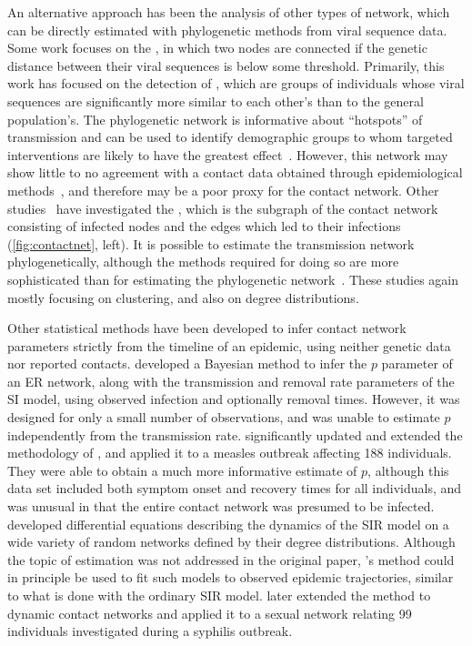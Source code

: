 An alternative approach has been the analysis of other types of network, which
can be directly estimated with phylogenetic methods from viral sequence data.
Some work focuses on the , in which two nodes are
connected if the genetic distance between their viral sequences is below some
threshold.  Primarily, this work has focused on the detection of
, which are groups of individuals whose viral
sequences are significantly more similar to each other's than to the general
population's.  The phylogenetic network is informative about ``hotspots'' of
transmission and can be used to identify demographic groups to whom targeted
interventions are likely to have the greatest effect~\autocite{poon2015impact}.
However, this network may show little to no agreement with a contact data
obtained through epidemiological methods~\autocite{yirrell1998molecular,
resik2007limitations, robinson2013dynamics}, and therefore may be a poor proxy
for the contact network. Other studies~\autocite{brown2011transmission} have
investigated the , which is the subgraph of the
contact network consisting of infected nodes and the edges which led to their
infections~\autocite{welch2011statistical} (\cref{fig:contactnet}, left). It is
possible to estimate the transmission network phylogenetically, although the
methods required for doing so are more sophisticated than for estimating the
phylogenetic network~\autocite{brown2011transmission}. These studies again
mostly focusing on clustering, and also on degree distributions.

Other statistical methods have been developed to infer contact network
parameters strictly from the timeline of an epidemic, using neither genetic
data nor reported contacts. \textcite{britton2002bayesian} developed a Bayesian
method to infer the $p$ parameter of an \gls{ER} network, along with the
transmission and removal rate parameters of the \gls{SI} model, using observed
infection and optionally removal times. However, it was designed for only a
small number of observations, and was unable to estimate $p$ independently from
the transmission rate.  \textcite{groendyke2011bayesian} significantly updated
and extended the methodology of \citeauthor{britton2002bayesian}, and applied
it to a measles outbreak affecting 188 individuals. They were able to obtain a
much more informative estimate of $p$, although this data set included both
symptom onset and recovery times for all individuals, and was unusual in that
the entire contact network was presumed to be infected. \textcite{volz2008sir}
developed differential equations describing the dynamics of the \gls{SIR} model
on a wide variety of random networks defined by their degree distributions.
Although the topic of estimation was not addressed in the original paper,
\citeauthor{volz2008sir}'s method could in principle be used to fit such models
to observed epidemic trajectories, similar to what is done with the ordinary
\gls{SIR} model. \textcite{volz2007susceptible} later extended the method to
dynamic contact networks and applied it to a sexual network relating 99
individuals investigated during a syphilis outbreak.

